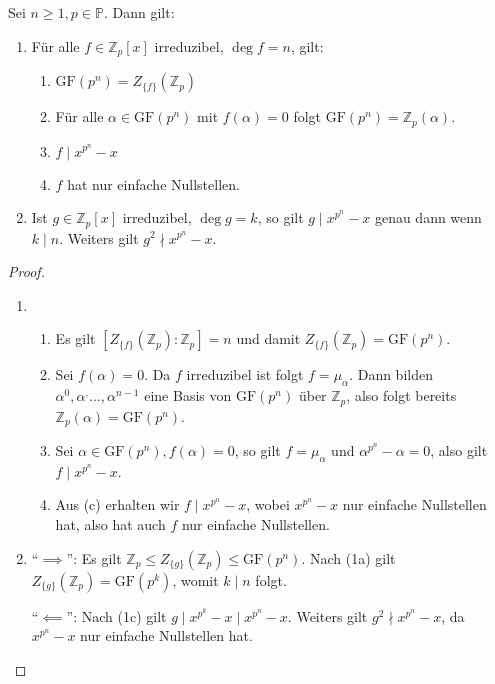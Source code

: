 \begin{lemma}
    Sei $n \geq 1, p \in \mathbb{P}$. Dann gilt:
    \begin{enumerate}
        \item Für alle $f \in \mathbb{Z}_p[x]$ irreduzibel, $\deg f = n$, gilt:
        \begin{enumerate}
            \item $\mathrm{GF}(p^n) = Z_{\{f\}}(\mathbb{Z}_p)$
            \item Für alle $\alpha \in \mathrm{GF}(p^n)$ mit $f(\alpha) = 0$ folgt $\mathrm{GF}(p^n) = \mathbb{Z}_p(\alpha)$.
            \item $f \mid x^{p^n} - x$
            \item $f$ hat nur einfache Nullstellen.
        \end{enumerate}
        \item Ist $g \in \mathbb{Z}_p[x]$ irreduzibel, $\deg g = k$, so gilt $g \mid x^{p^n} - x$ genau dann wenn $k \mid n$. Weiters gilt $g^2 \nmid x^{p^n} - x$.
    \end{enumerate}
\end{lemma}

\begin{proof}{\ }
    \begin{enumerate}
        \item \begin{enumerate}
            \item Es gilt $[Z_{\{f\}}(\mathbb{Z}_p) : \mathbb{Z}_p] = n$ und damit $Z_{\{f\}}(\mathbb{Z}_p) = \mathrm{GF}(p^n)$.
            \item Sei $f(\alpha) = 0$. Da $f$ irreduzibel ist folgt $f = \mu_\alpha$. Dann bilden $\alpha^0, \alpha^, \hdots, \alpha^{n-1}$ eine Basis von $\mathrm{GF}(p^n)$ über $\mathbb{Z}_p$, also folgt bereits $\mathbb{Z}_p(\alpha) = \mathrm{GF}(p^n)$.
            \item Sei $\alpha \in \mathrm{GF}(p^n), f(\alpha) = 0$, so gilt $f = \mu_\alpha$ und $\alpha^{p^n} - \alpha = 0$, also gilt $f \mid x^{p^n} - x$.
            \item Aus (c) erhalten wir $f \mid x^{p^n} - x$, wobei $x^{p^n} - x$ nur einfache Nullstellen hat, also hat auch $f$ nur einfache Nullstellen.
        \end{enumerate}
        \item ``$\implies$'': Es gilt $\mathbb{Z}_p \leq Z_{\{g\}}(\mathbb{Z}_p) \leq \mathrm{GF}(p^n)$. Nach (1a) gilt $Z_{\{g\}}(\mathbb{Z}_p) = \mathrm{GF}(p^k)$, womit $k \mid n$ folgt.
        
        ``$\impliedby$'': Nach (1c) gilt $g \mid x^{p^k} - x \mid x^{p^n} - x$. Weiters gilt $g^2 \nmid x^{p^n} - x$, da $x^{p^n} - x$ nur einfache Nullstellen hat.
    \end{enumerate}
\end{proof}